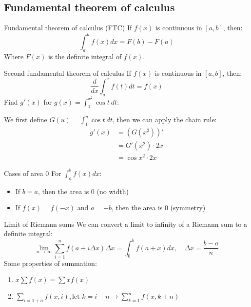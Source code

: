 \subsection{Fundamental theorem of calculus}
\begin{theorem}
    {Fundamental theorem of calculus (FTC)}
    If $f(x)$ is continuous in $[a,b]$, then:
    \[\int_{a}^{b}f(x)dx=F(b)-F(a)\]
    Where $F(x)$ is the definite integral of $f(x)$.
\end{theorem}
\begin{theorem}
    {Second fundamental theorem of calculus}
    If $f(x)$ is continuous in $[a,b]$, then:
    \[\frac{d}{dx}\int_{a}^{x}f(t)dt=f(x)\]
    \tcblower
    Find $g'(x)$ for $g(x)=\int_1^{x^2}\cos t\ dt$:

    We first define $G(u)=\int_1^{u}\cos t\ dt$, then we can apply the chain rule:
    \begin{align*}
        g'(x) & =(G(x^2))' \\&=G'(x^2)\cdot2x\\&=\cos x^2\cdot2x
    \end{align*}
\end{theorem}
\begin{knBox}
    {Cases of area 0}
    For $\int^{b}_{a}f(x)dx$:
    \begin{itemize}
        \item If $b=a$, then the area is 0 (no width)
        \item If $f(x)=f(-x)$ and $a=-b$, then the area is 0 (symmetry)
    \end{itemize}
\end{knBox}
\begin{theorem}
    {Limit of Riemann sums}
    We can convert a limit to infinity of a Riemann sum to a definite integral:
    \[\lim_{n\to\infty}\sum_{i=1}^{n}f(a+i\Delta x)\Delta x=\int_{0}^{b}f(a+x)dx,\quad\Delta x=\frac{b-a}{n}\]
    Some properties of summation:
    \begin{enumerate}
        \item $x\sum f(x) = \sum x f(x)$
        \item $\sum_{i=1+n} f(x, i), \text{let }k=i-n\to\sum_{k=1}^{n}f(x, k+n)$
    \end{enumerate}
\end{theorem}

\label{sec:integrationtech}
